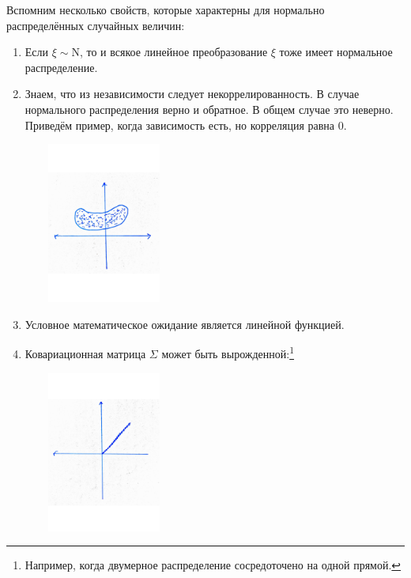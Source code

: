 \documentclass[specialist, 12pt,
subf, %
href, colorlinks=true,
substylefile = spbu.rtx,
]{disser}
\begin{document}
Вспомним несколько свойств, которые характерны для нормально распределённых случайных величин:
\begin{enumerate}
	\item Если $\xi \sim \mathrm{N}$, то и всякое линейное преобразование $\xi$ тоже имеет нормальное распределение.
	\item Знаем, что из независимости следует некоррелированность. В случае нормального распределения верно и обратное.
	В общем случае это неверно. Приведём пример, когда зависимость есть, но корреляция равна 0.
	\begin{center}
		\begin{minipage}{0.51\linewidth}
			\centering
			\includegraphics[width=150pt, height=150pt]{p07}
		\end{minipage}
	\end{center}
	\item Условное математическое ожидание является линейной функцией.
	\item Ковариационная матрица $\Sigma$ может быть вырожденной:\footnote{Например, когда двумерное распределение сосредоточено на одной прямой.}
	\begin{center}
		\begin{minipage}{0.4\linewidth}
			\centering
			\includegraphics[width=150pt, height=150pt]{p08}
		\end{minipage}
	\end{center}
	
\end{enumerate}
\end{document}
